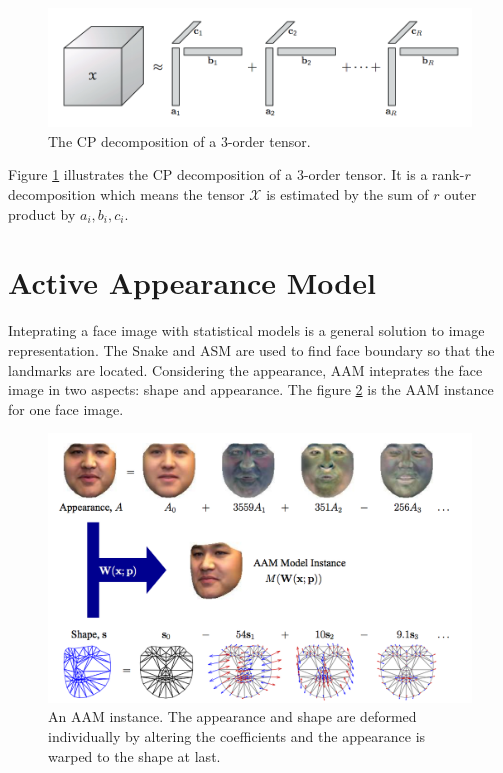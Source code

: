     \begin{figure}[!htb]
	    \centering
	    \includegraphics[scale=0.9]{figure/CP_Decomposition}
	    \caption{The CP decomposition of a $3$-order tensor. }
	    \label{fig:cp_de}
	\end{figure}

	Figure \ref{fig:cp_de} illustrates the CP decomposition of a $3$-order tensor.
	It is a rank-$r$ decomposition which means the tensor $\mathcal{X}$ is estimated
	by the sum of $r$ outer product by $a_i,b_i,c_i$.


\section{Active Appearance Model}
	
	Inteprating a face image with statistical models is a general solution to
	image representation. The Snake \cite{Snake88} and ASM \cite{ASM95} are
	used to find face boundary so that the landmarks are located. Considering
	the appearance, AAM \cite{AAM98,AAM01,Matthews_04} inteprates the face
	image in two aspects: shape and appearance. The figure \ref{fig:aam} is
	the AAM instance for one face image.

	\begin{figure}[!htb]
	    \centering
	    \includegraphics[scale=0.82]{figure/aam}
	    \caption{An AAM instance. The appearance and shape are deformed individually
	    by altering the coefficients and the appearance is warped to the shape at last.}
	    \label{fig:aam}
	\end{figure}

